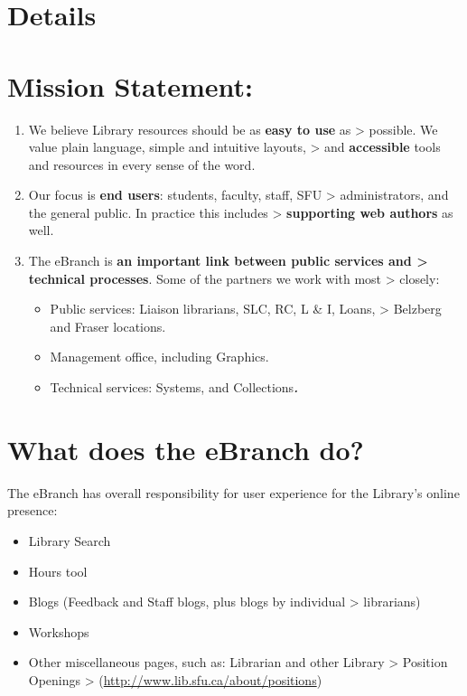 \documentclass[
  openany]{book}
\begin{document}
\hypertarget{details}{%
\chapter{Details}\label{details}}

\hypertarget{mission-statement}{%
\chapter{Mission Statement:}\label{mission-statement}}

\begin{enumerate}
\def\labelenumi{\Alph{enumi}.}
\item
  We believe Library resources should be as \textbf{easy to use} as
  \textgreater{} possible. We value plain language, simple and intuitive layouts,
  \textgreater{} and \textbf{accessible} tools and resources in every sense of the word.
\item
  Our focus is \textbf{end users}: students, faculty, staff, SFU
  \textgreater{} administrators, and the general public. In practice this includes
  \textgreater{} \textbf{supporting web authors} as well.
\item
  The eBranch is \textbf{an important link between public services and
  \textgreater{} technical processes}. Some of the partners we work with most
  \textgreater{} closely:

  \begin{itemize}
  \item
    Public services: Liaison librarians, SLC, RC, L \& I, Loans,
    \textgreater{} Belzberg and Fraser locations.
  \item
    Management office, including Graphics.
  \item
    Technical services: Systems, and Collections\textbf{\emph{.}}
  \end{itemize}
\end{enumerate}

\hypertarget{what-does-the-ebranch-do}{%
\chapter{What does the eBranch do?}\label{what-does-the-ebranch-do}}

The eBranch has overall responsibility for user experience for the
Library's online presence:

\begin{itemize}
\item
  Library Search
\item
  Hours tool
\item
  Blogs (Feedback and Staff blogs, plus blogs by individual
  \textgreater{} librarians)
\item
  Workshops
\item
  Other miscellaneous pages, such as: Librarian and other Library
  \textgreater{} Position Openings
  \textgreater{} (\href{http://www.lib.sfu.ca/about/positions}{{http://www.lib.sfu.ca/about/positions}})
\end{itemize}
\end{document}
